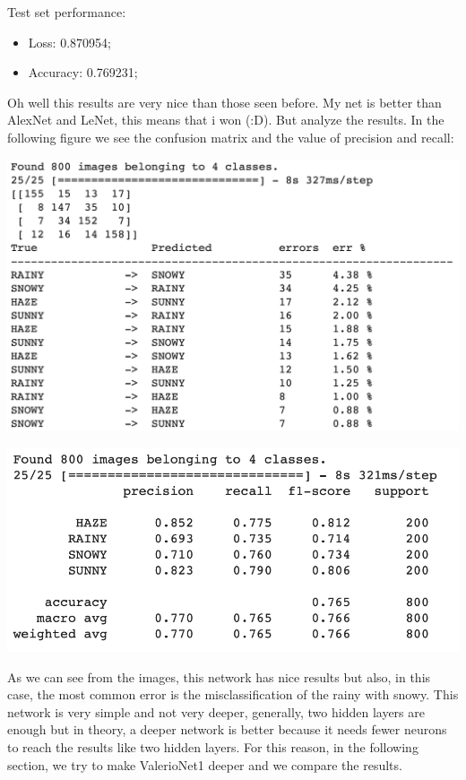 \documentclass[12pt]{article}
\begin{document}
\newpage
Test set performance:
\begin{itemize}
 \item Loss: 0.870954;
 \item Accuracy: 0.769231;
\end{itemize}

Oh well this results are very nice than those seen before. My net is better than AlexNet and LeNet, this means that i won (:D). But analyze the results. In the following figure we see the confusion matrix and the value of precision and recall:\newline \newline
\begin{minipage}[c]{.5\textwidth}
 \centering
 \includegraphics[width=\textwidth]{pic1}
\end{minipage}
\hspace{1em}
\begin{minipage}[c]{.5\textwidth}
 \centering
 \includegraphics[width=\textwidth]{pic2.png}
\end{minipage}

\bigskip
As we can see from the images, this network has nice results but also, in this case, the most common error is the misclassification of the rainy with snowy. This network is very simple and not very deeper, generally, two hidden layers are enough but in theory, a deeper network is better because it needs fewer neurons to reach the results like two hidden layers. For this reason, in the following section, we try to make ValerioNet1 deeper and we compare the results.
\end{document}
